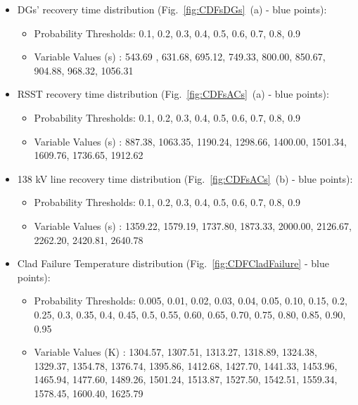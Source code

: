    \begin{itemize}
       \item DGs' recovery time distribution (Fig.~\ref{fig:CDFsDGs}~(a) - blue points): 
       \begin{itemize} 
            \item Probability Thresholds: 0.1, 0.2, 0.3, 0.4, 0.5, 0.6, 0.7, 0.8,  0.9
            \item Variable Values (s)           : 543.69 , 631.68, 695.12, 749.33, 800.00, 850.67, 904.88, 968.32, 1056.31
       \end{itemize}
       \item RSST recovery time distribution (Fig.~\ref{fig:CDFsACs}~(a) - blue points): 
       \begin{itemize} 
            \item Probability Thresholds:  0.1, 0.2,  0.3,  0.4, 0.5, 0.6, 0.7,  0.8,  0.9
            \item Variable Values (s)           :  887.38, 1063.35, 1190.24, 1298.66, 1400.00, 1501.34, 1609.76, 1736.65, 1912.62
       \end{itemize}
       \item 138 kV line recovery time distribution (Fig.~\ref{fig:CDFsACs}~(b) - blue points): 
       \begin{itemize} 
            \item Probability Thresholds: 0.1, 0.2, 0.3, 0.4, 0.5, 0.6, 0.7, 0.8, 0.9 
            \item Variable Values (s)           : 1359.22,  1579.19,  1737.80, 1873.33,  2000.00,  2126.67, 2262.20,  2420.81, 2640.78
       \end{itemize}
       \item Clad Failure Temperature distribution (Fig.~\ref{fig:CDFCladFailure} - blue points): 
       \begin{itemize} 
            \item Probability Thresholds: 0.005, 0.01, 0.02, 0.03, 0.04, 0.05, 0.10, 0.15, 0.2, 0.25, 0.3, 0.35, 0.4, 0.45, 0.5, 0.55, 0.60, 0.65, 0.70, 0.75, 0.80, 0.85, 0.90, 0.95
            \item Variable Values (K)           : 1304.57, 1307.51, 1313.27, 1318.89, 1324.38, 1329.37, 1354.78, 1376.74, 1395.86, 1412.68, 1427.70, 1441.33, 1453.96, 1465.94, 1477.60, 1489.26, 1501.24, 1513.87, 1527.50, 	1542.51, 1559.34, 1578.45, 1600.40, 1625.79
    \end{itemize}
\end{itemize}
\vspace{-5mm}

